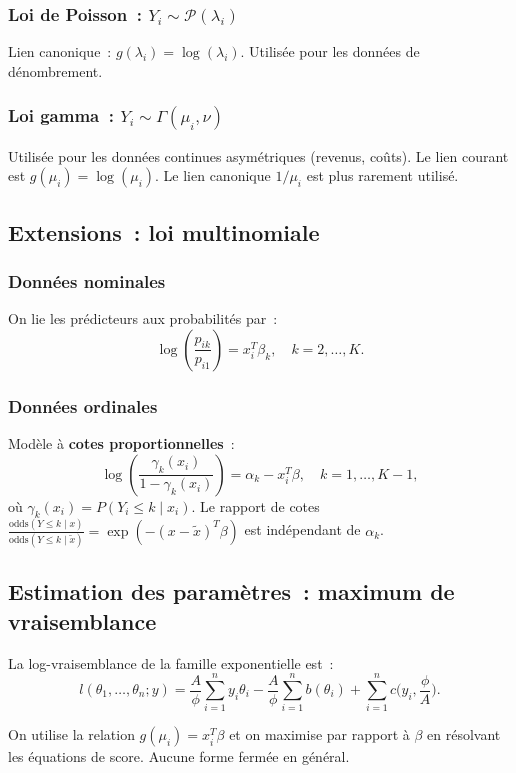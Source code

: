 \documentclass[11pt,letterpaper]{article}
\begin{document}
\subsubsection{Loi de Poisson~: $Y_i \sim \mathcal{P}(\lambda_i)$}
Lien canonique~: $g(\lambda_i) = \log(\lambda_i)$. Utilisée pour les données de dénombrement.

\subsubsection{Loi gamma~: $Y_i \sim \Gamma(\mu_i, \nu)$}
Utilisée pour les données continues asymétriques (revenus, coûts). Le lien courant est $g(\mu_i) = \log(\mu_i)$. Le lien canonique $1/\mu_i$ est plus rarement utilisé.

\subsection{Extensions~: loi multinomiale}

\subsubsection{Données nominales}
On lie les prédicteurs aux probabilités par~:
$$\log\left(\frac{p_{ik}}{p_{i1}}\right) = x_i^T \beta_k, \quad k=2,\ldots,K.$$

\subsubsection{Données ordinales}
Modèle à \textbf{cotes proportionnelles}~:
$$\log\left(\frac{\gamma_k(x_i)}{1-\gamma_k(x_i)}\right) = \alpha_k - x_i^T \beta, \quad k=1,\ldots,K-1,$$
où $\gamma_k(x_i) = P(Y_i \leq k \mid x_i)$. Le rapport de cotes $\frac{\text{odds}(Y \leq k \mid x)}{\text{odds}(Y \leq k \mid \tilde{x})} = \exp(-(x-\tilde{x})^T\beta)$ est indépendant de $\alpha_k$.

\subsection{Estimation des paramètres~: maximum de vraisemblance}

La log-vraisemblance de la famille exponentielle est~:
$$l(\theta_1,\ldots,\theta_n; y) = \frac{A}{\phi}\sum_{i=1}^n y_i\theta_i - \frac{A}{\phi}\sum_{i=1}^n b(\theta_i) + \sum_{i=1}^n c\Big(y_i, \frac{\phi}{A}\Big).$$

On utilise la relation $g(\mu_i) = x_i^T\beta$ et on maximise par rapport à $\beta$ en résolvant les équations de score. Aucune forme fermée en général.
\end{document}
